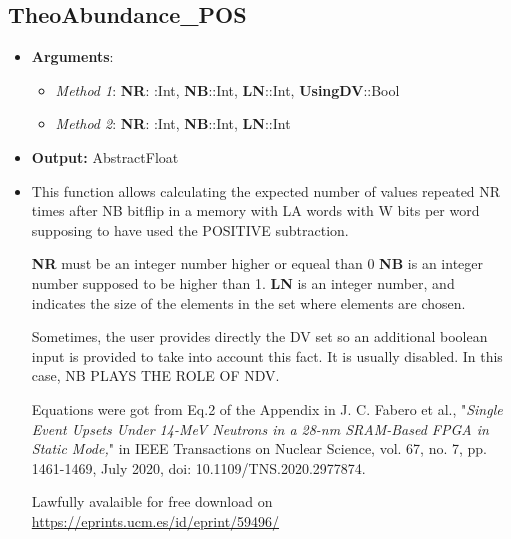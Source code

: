 \subsection*{TheoAbundance\_POS}
%
\begin{itemize}
	\item \textbf{Arguments}:
	\begin{itemize}
		\item \textit{Method 1}: \textbf{NR}: :Int, \textbf{NB}::Int, \textbf{LN}::Int, \textbf{UsingDV}::Bool
		\item \textit{Method 2}: \textbf{NR}: :Int, \textbf{NB}::Int, \textbf{LN}::Int
	\end{itemize}
	\item \textbf{Output:} AbstractFloat
	\item This function allows calculating the expected number of values repeated 	 NR times after NB bitflip in a memory with LA words with W bits per word   	supposing to have used the POSITIVE subtraction.
 
  \textbf{NR} must be an integer number higher or equeal than 0
  \textbf{NB} is an integer number supposed to be higher than 1.
  \textbf{LN} is an integer number, and indicates the size of the elements in the set
  where elements are chosen.
 
  Sometimes, the user provides directly the DV set so an additional boolean
  input is provided to take into account this fact. It is usually disabled. In this
  case, NB PLAYS THE ROLE OF NDV.
 
  Equations were got from Eq.2 of the Appendix in J. C. Fabero et al., "\textit{Single Event Upsets Under 14-MeV Neutrons in a 28-nm
 SRAM-Based FPGA in Static Mode,}" in IEEE Transactions on Nuclear Science, vol.
  67, no. 7, pp. 1461-1469, July 2020, doi: 10.1109/TNS.2020.2977874.
  
  Lawfully avalaible for free download on \href{https://eprints.ucm.es/id/eprint/59496/}{https://eprints.ucm.es/id/eprint/59496/}
\end{itemize}
%
